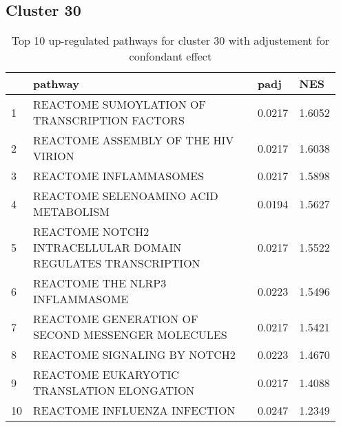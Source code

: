\documentclass{article}
\begin{document}
\subsection{Cluster 30 }
\begin{table}[H]
\centering
\begin{tabular}{p{0.05\linewidth}p{0.7\linewidth}p{0.1\linewidth}p{0.1\linewidth}}
  \hline
 & pathway & padj & NES \\ 
  \hline
1 & REACTOME SUMOYLATION OF TRANSCRIPTION FACTORS & 0.0217 & 1.6052 \\ 
  2 & REACTOME ASSEMBLY OF THE HIV VIRION & 0.0217 & 1.6038 \\ 
  3 & REACTOME INFLAMMASOMES & 0.0217 & 1.5898 \\ 
  4 & REACTOME SELENOAMINO ACID METABOLISM & 0.0194 & 1.5627 \\ 
  5 & REACTOME NOTCH2 INTRACELLULAR DOMAIN REGULATES TRANSCRIPTION & 0.0217 & 1.5522 \\ 
  6 & REACTOME THE NLRP3 INFLAMMASOME & 0.0223 & 1.5496 \\ 
  7 & REACTOME GENERATION OF SECOND MESSENGER MOLECULES & 0.0217 & 1.5421 \\ 
  8 & REACTOME SIGNALING BY NOTCH2 & 0.0223 & 1.4670 \\ 
  9 & REACTOME EUKARYOTIC TRANSLATION ELONGATION & 0.0217 & 1.4088 \\ 
  10 & REACTOME INFLUENZA INFECTION & 0.0247 & 1.2349 \\ 
   \hline
\end{tabular}
\caption{Top 10 up-regulated pathways for cluster 30 with adjustement for confondant effect} 
\label{tab:q3_2_conf_30}
\end{table}
\end{document}
